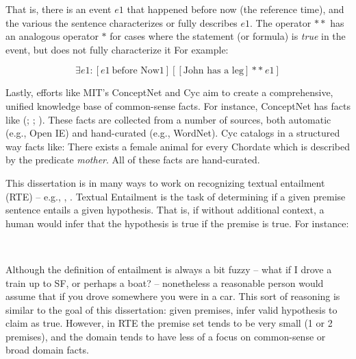 That is, there is an event $e1$ that happened before now (the reference time), and the various
  the sentence  characterizes or fully describes $e1$.
The operator $**$ has an analogous operator $*$ for cases where the statement (or formula)
  is \textit{true} in the event, but does not fully characterize it
For example:

\begin{equation*}
\exists e1 : [ e1 ~ \textrm{before Now1} ] \left[ [ \textrm{John has a leg} ] **~ e1 \right]
\end{equation*}


Lastly, efforts like MIT's ConceptNet \cite{key:2011tandon-conceptnet} and Cyc \cite{key:1995lenat-cyc}
  aim to create a comprehensive, unified knowledge base of common-sense facts.
For instance, ConceptNet has facts like (; ; ).
These facts are collected from a number of sources, both automatic (e.g., Open IE) and hand-curated
  (e.g., WordNet).
Cyc catalogs in a structured way facts like: There exists a female animal for every Chordate
  which is described by the predicate \textit{mother}.
All of these facts are hand-curated.


%
%

This dissertation is in many ways to work on 
  recognizing textual entailment (RTE) -- e.g., 
  , .
Textual Entailment is the task of determining if a given premise sentence
  entails a given hypothesis.
That is, if without additional context, a human would infer that the hypothesis
  is true if the premise is true.
For instance:

\begin{displayquote}
   \\
\end{displayquote}

Although the definition of entailment is always a bit fuzzy -- what if I drove a train
  up to SF, or perhaps a boat? -- nonetheless a reasonable person would assume that if
  you drove somewhere you were in a car.
This sort of reasoning is similar to the goal of this dissertation: given premises, infer
  valid hypothesis to claim as true.
However, in RTE the premise set tends to be very small (1 or 2 premises), and the domain
  tends to have less of a focus on common-sense or broad domain facts.


